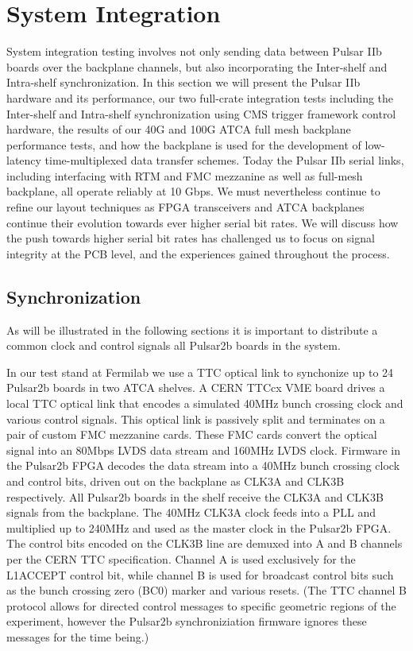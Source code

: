 \documentclass[letterpaper]{article}
\begin{document}

\section{System Integration}

System integration testing involves not only sending data between Pulsar IIb boards over the backplane channels, but also incorporating the Inter-shelf and Intra-shelf synchronization. In this section we will present the Pulsar IIb hardware and its performance, our two full-crate integration tests including the Inter-shelf and Intra-shelf synchronization using CMS trigger framework control hardware, the results of our 40G and 100G ATCA full mesh backplane performance tests, and how the backplane is used for the development of low-latency time-multiplexed data transfer schemes. Today the Pulsar IIb serial links, including interfacing with RTM and FMC mezzanine as well as full-mesh backplane, all operate reliably at 10 Gbps.  We must nevertheless continue to refine our layout techniques as FPGA transceivers and ATCA backplanes continue their evolution towards ever higher serial bit rates. We will discuss how the push towards higher serial bit rates has challenged us to focus on signal integrity at the PCB level, and the experiences gained throughout the process. 

\subsection{Synchronization}
\label{section_ttc}

As will be illustrated in the following sections it is important to distribute a common clock and control signals all Pulsar2b boards in the system.  

In our test stand at Fermilab we use a TTC optical link\cite{cern_ttc} to synchonize up to 24 Pulsar2b boards in two ATCA shelves.  A CERN TTCcx VME board drives a local TTC optical link that encodes a simulated 40MHz bunch crossing clock and various control signals.  This optical link is passively split and terminates on a pair of custom FMC mezzanine cards.  These FMC cards convert the optical signal into an 80Mbps LVDS data stream and 160MHz LVDS clock.  Firmware in the Pulsar2b FPGA decodes the data stream into a 40MHz bunch crossing clock and control bits, driven out on the backplane as CLK3A and CLK3B respectively.  All Pulsar2b boards in the shelf receive the CLK3A and CLK3B signals from the backplane.  The 40MHz CLK3A clock feeds into a PLL and multiplied up to 240MHz and used as the master clock in the Pulsar2b FPGA.  The control bits encoded on the CLK3B line are demuxed into A and B channels per the CERN TTC specification.  Channel A is used exclusively for the L1ACCEPT control bit, while channel B is used for broadcast control bits such as the bunch crossing zero (BC0) marker and various resets.  (The TTC channel B protocol allows for directed control messages to specific geometric regions of the experiment, however the Pulsar2b synchroniziation  firmware ignores these messages for the time being.)
\end{document}
